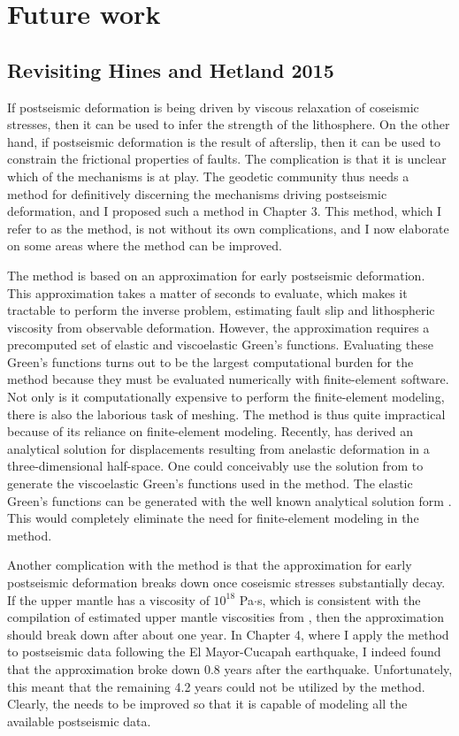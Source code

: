 \section{Future work}
\subsection{Revisiting Hines and Hetland 2015}
If postseismic deformation is being driven by viscous relaxation of coseismic stresses, then it can be used to infer the strength of the lithosphere. On the other hand, if postseismic deformation is the result of afterslip, then it can be used to constrain the frictional properties of faults. The complication is that it is unclear which of the mechanisms is at play. The geodetic community thus needs a method for definitively discerning the mechanisms driving postseismic deformation, and I proposed such a method in Chapter 3. This method, which I refer to as the \citet{Hines2016} method, is not without its own complications, and I now elaborate on some areas where the method can be improved.  

The \citet{Hines2016} method is based on an approximation for early postseismic deformation. This approximation takes a matter of seconds to evaluate, which makes it tractable to perform the inverse problem, estimating fault slip and lithospheric viscosity from observable deformation. However, the approximation requires a precomputed set of elastic and viscoelastic Green's functions. Evaluating these Green's functions turns out to be the largest computational burden for the \citet{Hines2016} method because they must be evaluated numerically with finite-element software. Not only is it computationally expensive to perform the finite-element modeling, there is also the laborious task of meshing. The \citet{Hines2016} method is thus quite impractical because of its reliance on finite-element modeling. Recently, \citet{Barbot2017} has derived an analytical solution for displacements resulting from anelastic deformation in a three-dimensional half-space. One could conceivably use the solution from \citet{Barbot2017} to generate the viscoelastic Green's functions used in the \citet{Hines2016} method. The elastic Green's functions can be generated with the well known analytical solution form \citet{Okada1992}. This would completely eliminate the need for finite-element modeling in the \citet{Hines2016} method.       
 
Another complication with the \citet{Hines2016} method is that the approximation for early postseismic deformation breaks down once coseismic stresses substantially decay. If the upper mantle has a viscosity of $10^{18}$ Pa$\cdot$s, which is consistent with the compilation of estimated upper mantle viscosities from \citep{Thatcher2008}, then the approximation should break down after about one year. In Chapter 4, where I apply the \citet{Hines2016} method to postseismic data following the El Mayor-Cucapah earthquake, I indeed found that the approximation broke down 0.8 years after the earthquake. Unfortunately, this meant that the remaining 4.2 years could not be utilized by the \citet{Hines2016} method. Clearly, the \citet{Hines2016} needs to be improved so that it is capable of modeling all the available postseismic data.             

